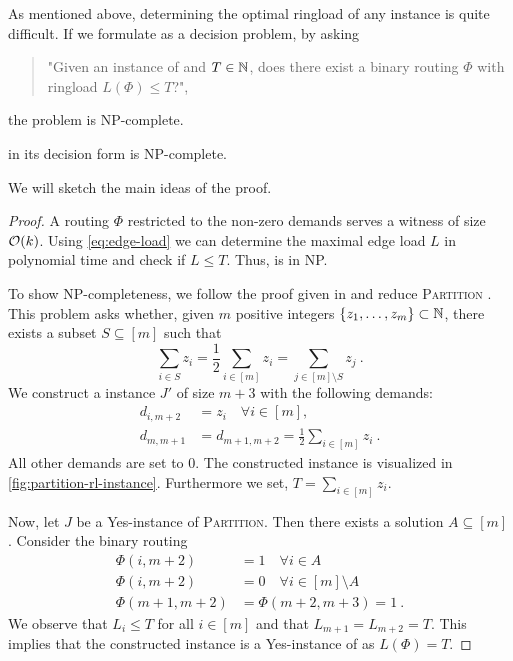 As mentioned above, determining the optimal ringload of any \RL instance is quite difficult.
If we formulate \RL as a decision problem, by asking
\begin{quote}
	"Given an instance of \RL and $T \in \mathbb{N}$, does there exist a binary routing $\Phi$ with ringload $L(\Phi) \leq T$?",
\end{quote}
the problem is NP-complete.
\begin{theorem}
	\RL in its decision form is NP-complete.
\end{theorem}

We will sketch the main ideas of the proof.
\begin{proof}
	A routing $\Phi$ restricted to the non-zero demands serves a witness of size $\mathcal{O}(k)$.
	Using \cref{eq:edge-load} we can determine the maximal edge load $L$ in polynomial time and check if $L \leq T$.
	Thus, \RL is in NP.
	
	To show NP-completeness, we follow the proof given in \cite{schrijver99} and reduce \textsc{Partition} \cite{karp72}.
	This problem asks whether, given $m$ positive integers $\{z_1, \ldots, z_m\} \subset \mathbb{N}$, there exists a subset $S \subseteq [m]$ such that 
	\begin{equation}
		\sum_{i \in S} z_i = \frac{1}{2}  \sum_{i \in [m]} z_i = \sum_{j \in [m] \setminus S} z_j\ .
	\end{equation}
	We construct a \RL instance $J'$ of size $m + 3$ with the following demands:
	\begin{align}
			d_{i, m+2} &= z_i \quad \forall i \in [m], \\
			d_{m, m+1} &= d_{m+1, m+2} = \frac{1}{2}  \sum_{i \in [m]} z_i \ . 
	\end{align}
	All other demands are set to $0$.
	The constructed instance is visualized in \cref{fig:partition-rl-instance}.
	Furthermore we set, $T = \sum_{i \in [m]} z_i$.
	
	Now, let $J$ be a Yes-instance of \textsc{Partition}.
	Then there exists a solution $A \subseteq [m]$.
	Consider the binary routing
	\begin{align}
		\Phi(i, m+2) &= 1 \quad \forall i \in A \\
		\Phi(i, m+2) &= 0 \quad \forall i \in [m] \setminus A \\
		\Phi(m+1, m+2) & = \Phi(m+2, m+3) = 1 \ .
	\end{align}
	We observe that $L_i \leq T$ for all $i \in [m]$ and that $L_{m+1} = L_{m+2} = T$.
	This implies that the constructed instance is a Yes-instance of \RL as $L(\Phi) = T$.
	

\end{proof}
